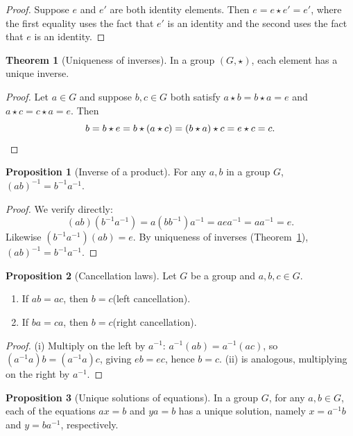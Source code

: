 \documentclass[12pt,a4paper,openany]{book}
\theoremstyle{definition}
\newtheorem{theorem}{Theorem}[chapter]
\newtheorem{proposition}{Proposition}[chapter]
\theoremstyle{remark}
\begin{document}
\begin{proof}
Suppose $e$ and $e'$ are both identity elements.  Then
$e = e\star e' = e'$, where the first equality uses the fact that $e'$ is
an identity and the second uses the fact that $e$ is an identity.
\end{proof}

\begin{theorem}[Uniqueness of inverses]
\label{thm:unique-inverse}
In a group $(G,\star)$, each element has a unique inverse.
\end{theorem}

\begin{proof}
Let $a\in G$ and suppose $b,c\in G$ both satisfy $a\star b = b\star a = e$
and $a\star c = c\star a = e$.  Then
\[
  b = b\star e = b\star(a\star c) = (b\star a)\star c = e\star c = c.
  \qedhere
\]
\end{proof}

\begin{proposition}[Inverse of a product]
\label{prop:inv-product}
For any $a,b$ in a group $G$, $(ab)^{-1} = b^{-1}a^{-1}$.
\end{proposition}

\begin{proof}
We verify directly:
\[
  (ab)(b^{-1}a^{-1}) = a(bb^{-1})a^{-1} = aea^{-1} = aa^{-1} = e.
\]
Likewise $(b^{-1}a^{-1})(ab) = e$.  By uniqueness of inverses
(Theorem~\ref{thm:unique-inverse}), $(ab)^{-1} = b^{-1}a^{-1}$.
\end{proof}

\begin{proposition}[Cancellation laws]
\label{prop:cancellation}
Let $G$ be a group and $a,b,c\in G$.
\begin{enumerate}[label=(\roman*)]
  \item If $ab = ac$, then $b = c$\quad (left cancellation).
  \item If $ba = ca$, then $b = c$\quad (right cancellation).
\end{enumerate}
\end{proposition}

\begin{proof}
(i) Multiply on the left by $a^{-1}$: $a^{-1}(ab) = a^{-1}(ac)$, so
$(a^{-1}a)b = (a^{-1}a)c$, giving $eb = ec$, hence $b = c$.
(ii) is analogous, multiplying on the right by $a^{-1}$.
\end{proof}

\begin{proposition}[Unique solutions of equations]
\label{prop:unique-solutions}
In a group $G$, for any $a,b\in G$, each of the equations $ax=b$ and
$ya=b$ has a unique solution, namely $x=a^{-1}b$ and $y=ba^{-1}$,
respectively.
\end{proposition}
\end{document}
